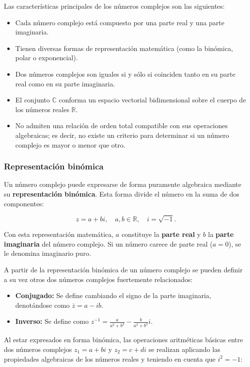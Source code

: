 Las características principales de los números complejos son las siguientes:

\begin{itemize}
    \item Cada número complejo está compuesto por una parte real y una parte imaginaria.
    \item Tienen diversas formas de representación matemática (como la binómica, polar o exponencial).
    \item Dos números complejos son iguales si y sólo si coinciden tanto en su parte real como en su parte imaginaria.
    \item El conjunto $\mathbb{C}$ conforma un espacio vectorial bidimensional sobre el cuerpo de los números reales $\mathbb{R}$.
    \item No admiten una relación de orden total compatible con sus operaciones algebraicas; es decir, no existe un criterio para determinar si un número complejo es mayor o menor que otro.
\end{itemize}

\subsubsection{Representación binómica}

Un número complejo puede expresarse de forma puramente algebraica mediante su \textbf{representación binómica}. Esta forma divide el número en la suma de dos componentes:

\[
    z = a + bi, \quad a, b \in \mathbb{R}, \quad i = \sqrt{-1}.
\]

Con esta representación matemática, $a$ constituye la \textbf{parte real} y $b$ la \textbf{parte imaginaria} del número complejo. Si un número carece de parte real ($a=0$), se le denomina imaginario puro.

A partir de la representación binómica de un número complejo se pueden definir a su vez otros dos números complejos fuertemente relacionados:

\begin{itemize}
    \item \textbf{Conjugado:} Se define cambiando el signo de la parte imaginaria, denotándose como $\overline{z} = a - ib$.
    \item \textbf{Inverso:} Se define como $z^{-1} = \frac{a}{a^2 + b^2} - \frac{b}{a^2 + b^2}i$.
\end{itemize}

Al estar expresados en forma binómica, las operaciones aritméticas básicas entre dos números complejos $z_1 = a + bi$ y $z_2 = c + di$ se realizan aplicando las propiedades algebraicas de los números reales y teniendo en cuenta que $i^2 = -1$:

